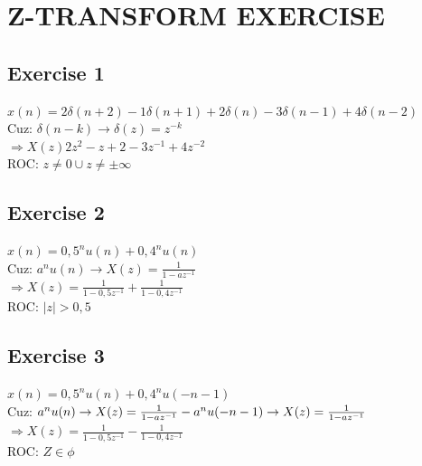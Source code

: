 \documentclass[13pt,a4paper]{article}
\begin{document}
	
	\newpage
	
	
	\section{Z-TRANSFORM EXERCISE}
		\subsection{Exercise 1}
			$x(n) = 2\delta(n + 2) - 1\delta(n + 1) + 2\delta(n) - 3\delta(n - 1) + 4\delta(n - 2)$
			\\
			Cuz: $\delta(n - k) \rightarrow \delta(z) = z^{-k}$
			\\$\Rightarrow X(z) 2z^2 - z + 2 - 3z^{-1} + 4z^{-2}$
			\\
			ROC: $z \neq 0 \cup z \neq \pm\infty$
		\subsection{Exercise 2}
			$x(n) = 0,5^nu(n) + 0,4^nu(n)$
			\\
			Cuz: $a^nu(n) \rightarrow X(z) = \frac{1}{1 - az^{-1}}$
			\\
			$\Rightarrow X(z) = \frac{1}{1 - 0,5z^{-1}} + \frac{1}{1 - 0,4z^{-1}}$
			\\
			ROC: $\mid z \mid > 0,5$
		\subsection{Exercise 3}
			$x(n) = 0,5^nu(n) + 0,4^nu(-n - 1)$
			\\
			Cuz: $a^nu(n) \rightarrow X(z) = \frac{1}{1 - az^{-1}}
				\\          -a^nu(-n - 1) \rightarrow X(z) = \frac{1}{1 - az^{-1}}$
			\\
			$\Rightarrow X(z) = \frac{1}{1 - 0,5z^{-1}} - \frac{1}{1 - 0,4z^{-1}}$
			\\
			ROC: $Z \in \phi$
	
\end{document}
